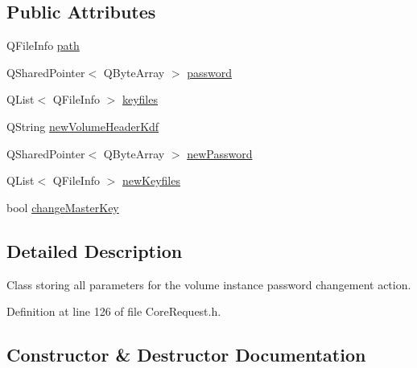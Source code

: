 \subsection*{Public Attributes}
\begin{DoxyCompactItemize}
\item 
Q\+File\+Info \hyperlink{struct_gost_crypt_1_1_core_1_1_change_volume_password_request_a6b75efa52b3a4163ac1aec31994ba269}{path}
\item 
Q\+Shared\+Pointer$<$ Q\+Byte\+Array $>$ \hyperlink{struct_gost_crypt_1_1_core_1_1_change_volume_password_request_a1a223532ff6173ef3e5b6af9327a54ad}{password}
\item 
Q\+List$<$ Q\+File\+Info $>$ \hyperlink{struct_gost_crypt_1_1_core_1_1_change_volume_password_request_a48d16f1fb625a533786ecb74e7c62222}{keyfiles}
\item 
Q\+String \hyperlink{struct_gost_crypt_1_1_core_1_1_change_volume_password_request_a2cc73e316eca2f297e03d06a30f87dd4}{new\+Volume\+Header\+Kdf}
\item 
Q\+Shared\+Pointer$<$ Q\+Byte\+Array $>$ \hyperlink{struct_gost_crypt_1_1_core_1_1_change_volume_password_request_abcc0366bf5718eb5fb3adaf4c5874711}{new\+Password}
\item 
Q\+List$<$ Q\+File\+Info $>$ \hyperlink{struct_gost_crypt_1_1_core_1_1_change_volume_password_request_a8e3120235c60e7eb2849b7f47bb39358}{new\+Keyfiles}
\item 
bool \hyperlink{struct_gost_crypt_1_1_core_1_1_change_volume_password_request_a4ca255444d570df7e6e57fbe2d0f6ebd}{change\+Master\+Key}
\end{DoxyCompactItemize}


\subsection{Detailed Description}
Class storing all parameters for the volume instance password changement action. 

Definition at line 126 of file Core\+Request.\+h.



\subsection{Constructor \& Destructor Documentation}
\mbox{\label{struct_gost_crypt_1_1_core_1_1_change_volume_password_request_a989715188b3ea4bc24bd1249f8dca2c1}} 
